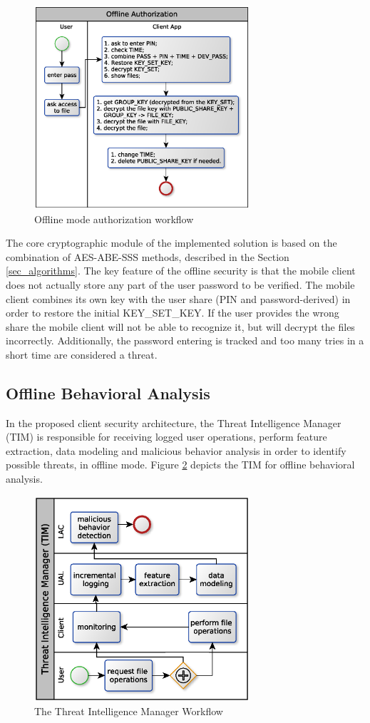 \documentclass[twocolumn]{svjour3}          	%
\begin{document}
\begin{figure}[h!]
	\centering
	\includegraphics[width=8cm]{fig05.eps}
	\caption{Offline mode authorization workflow}
	\label{fig:05}
\end{figure}

The core cryptographic module of the implemented solution is based on the combination of AES-ABE-SSS methods, described in the Section \ref{sec_algorithms}. The key feature of the offline security is that the mobile client does not actually store any part of the user password to be verified. The mobile client combines its own key with the user share (PIN and password-derived) in order to restore the initial KEY\_SET\_KEY. If the user provides the wrong share the mobile client will not be able to recognize it, but will decrypt the files incorrectly. Additionally, the password entering is tracked and too many tries in a short time are considered a threat.

\subsection{Offline Behavioral Analysis}
\label{sec_offline_behavioral_analysis}

In the proposed client security architecture, the Threat Intelligence Manager (TIM) is responsible for receiving logged user operations, perform feature extraction, data modeling and malicious behavior analysis in order to identify possible threats, in offline mode. Figure \ref{fig:06} depicts the TIM for offline behavioral analysis. 

\begin{figure}[h!]
	\centering
	\includegraphics[width=8cm]{fig06.eps}
	\caption{The Threat Intelligence Manager Workflow}
	\label{fig:06}
\end{figure}
\end{document}
